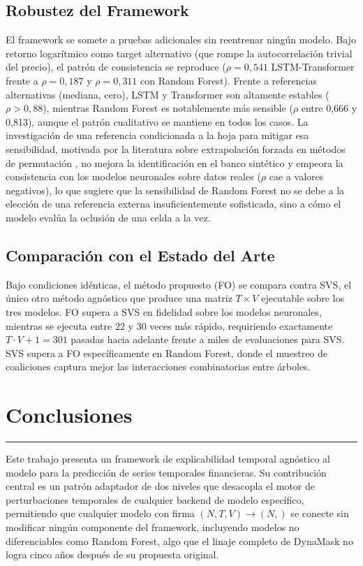 \section{Robustez del Framework}

El framework se somete a pruebas adicionales sin reentrenar ningún modelo. Bajo retorno logarítmico como target alternativo (que rompe la autocorrelación trivial del precio), el patrón de consistencia se reproduce ($\rho=0{,}541$ LSTM-Transformer frente a $\rho=0{,}187$ y $\rho=0{,}311$ con Random Forest). Frente a referencias alternativas (mediana, cero), LSTM y Transformer son altamente estables ($\rho>0{,}88$), mientras Random Forest es notablemente más sensible ($\rho$ entre 0{,}666 y 0{,}813), aunque el patrón cualitativo se mantiene en todos los casos. La investigación de una referencia condicionada a la hoja para mitigar esa sensibilidad, motivada por la literatura sobre extrapolación forzada en métodos de permutación \cite{hooker2021}, no mejora la identificación en el banco sintético y empeora la consistencia con los modelos neuronales sobre datos reales ($\rho$ cae a valores negativos), lo que sugiere que la sensibilidad de Random Forest no se debe a la elección de una referencia externa insuficientemente sofisticada, sino a cómo el modelo evalúa la oclusión de una celda a la vez.

\section{Comparación con el Estado del Arte}

Bajo condiciones idénticas, el método propuesto (FO) se compara contra SVS, el único otro método agnóstico que produce una matriz $T \times V$ ejecutable sobre los tres modelos. FO supera a SVS en fidelidad sobre los modelos neuronales, mientras se ejecuta entre $22$ y $30$ veces más rápido, requiriendo exactamente $T{\cdot}V{+}1=301$ pasadas hacia adelante frente a miles de evaluaciones para SVS. SVS supera a FO específicamente en Random Forest, donde el muestreo de coaliciones captura mejor las interacciones combinatorias entre árboles.


\chapter{Conclusiones}
\hrule \bigskip \vspace*{1cm}

Este trabajo presenta un framework de explicabilidad temporal agnóstico al modelo para la predicción de series temporales financieras. Su contribución central es un patrón adaptador de dos niveles que desacopla el motor de perturbaciones temporales de cualquier backend de modelo específico, permitiendo que cualquier modelo con firma $(N,T,V) \rightarrow (N,)$ se conecte sin modificar ningún componente del framework, incluyendo modelos no diferenciables como Random Forest, algo que el linaje completo de DynaMask no logra cinco años después de su propuesta original.

